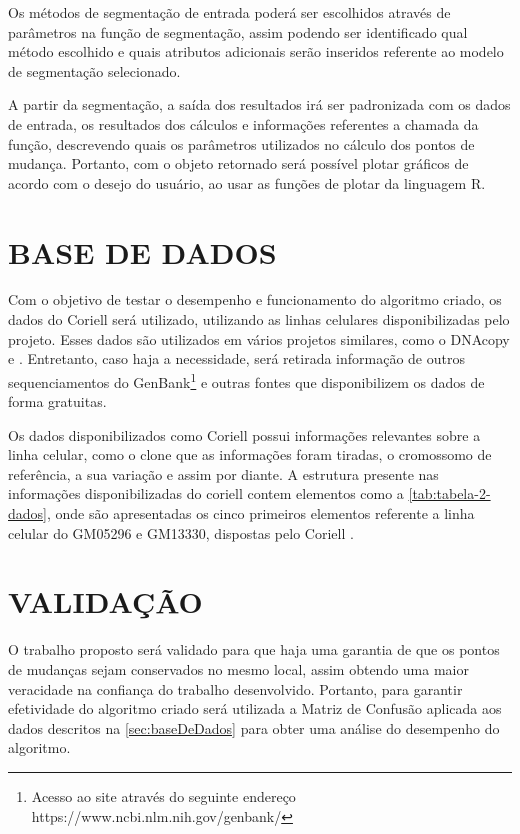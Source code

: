 Os métodos de segmentação de entrada poderá ser escolhidos através de parâmetros na função de segmentação, assim podendo ser identificado qual método escolhido e quais atributos adicionais serão inseridos referente ao modelo de segmentação selecionado.

A partir da segmentação, a saída dos resultados irá ser padronizada com os dados de entrada, os resultados dos cálculos e informações referentes a chamada da função, descrevendo quais os parâmetros utilizados no cálculo dos pontos de mudança. Portanto, com o objeto retornado será possível plotar gráficos de acordo com o desejo do usuário, ao usar as funções de plotar da linguagem R.

\section{BASE DE DADOS} 
\label{sec:baseDeDados} 

Com o objetivo de testar o desempenho e funcionamento do algoritmo criado, os dados do Coriell \cite{Snijders2001} será utilizado, utilizando as linhas celulares disponibilizadas pelo projeto. Esses dados são utilizados em vários projetos similares, como o DNAcopy \cite{Olshen2004} e \cite{Girimurugan2018}. Entretanto, caso haja a necessidade, será retirada informação de outros sequenciamentos do GenBank\footnote{Acesso ao site através do seguinte endereço https://www.ncbi.nlm.nih.gov/genbank/} e outras fontes que disponibilizem os dados de forma gratuitas.

Os dados disponibilizados como Coriell possui informações relevantes sobre a linha celular, como o clone que as informações foram tiradas, o cromossomo de referência, a sua variação e assim por diante. A estrutura presente nas informações disponibilizadas do coriell contem elementos como a \autoref{tab:tabela-2-dados}, onde são apresentadas os cinco primeiros elementos referente a linha celular do GM05296 e GM13330, dispostas pelo Coriell \cite{Snijders2001}.



\section{VALIDAÇÃO} 

O trabalho proposto será validado para que haja uma garantia de que os pontos de mudanças sejam conservados no mesmo local, assim obtendo uma maior veracidade na confiança do trabalho desenvolvido. Portanto, para garantir efetividade do algoritmo criado será utilizada a Matriz de Confusão aplicada aos dados descritos na \autoref{sec:baseDeDados} para obter uma análise do desempenho do algoritmo.
